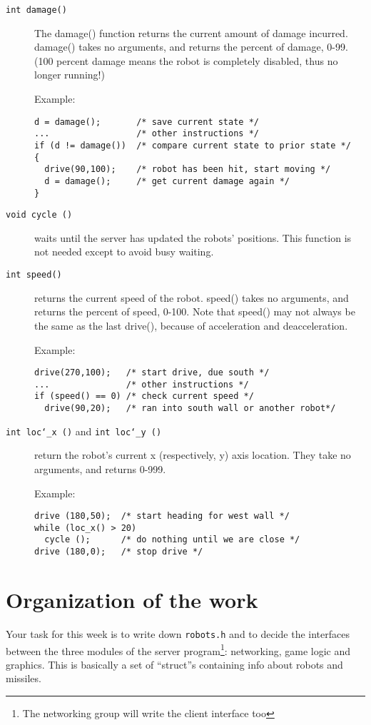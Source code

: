 \documentclass{article}
\def\UL{\char`\_}
\begin{document}
\begin{description}
\item[\texttt{int damage()}]
        The damage() function returns the current amount of damage
        incurred.  damage() takes no arguments, and returns the percent
        of damage, 0-99. (100 percent damage means the robot is
        completely disabled, thus no longer running!) 

        Example:
\begin{verbatim}
d = damage();       /* save current state */
...                 /* other instructions */
if (d != damage())  /* compare current state to prior state */
{
  drive(90,100);    /* robot has been hit, start moving */
  d = damage();     /* get current damage again */
} 
\end{verbatim}

\item[\texttt{void cycle ()}]
        waits until the server has updated the robots' positions.
        This function is not needed except to avoid busy waiting.

\item[\texttt{int speed()}]
        returns the current speed of the robot.
        speed() takes no arguments, and returns the percent of speed,
        0-100.  Note that speed() may not always be the same as the last
        drive(), because of acceleration and deacceleration.

        Example:
\begin{verbatim}
drive(270,100);   /* start drive, due south */
...               /* other instructions */
if (speed() == 0) /* check current speed */
  drive(90,20);   /* ran into south wall or another robot*/
\end{verbatim}

\item[\texttt{int loc\UL x ()} and \texttt{int loc\UL y ()}]
        return the robot's current x (respectively, y) axis location.
        They take no arguments, and returns 0-999.

        Example:
\begin{verbatim}
drive (180,50);  /* start heading for west wall */
while (loc_x() > 20)
  cycle ();      /* do nothing until we are close */
drive (180,0);   /* stop drive */
\end{verbatim}
\end{description}

\section{Organization of the work}

       Your task for this week is to write down \texttt{robots.h} and
       to decide the interfaces between the three modules of the server
       program\footnote{The networking group will write the client
         interface too}: networking, game logic and graphics.  This is
       basically a set of ``struct''s containing info about robots and
       missiles.
\end{document}
